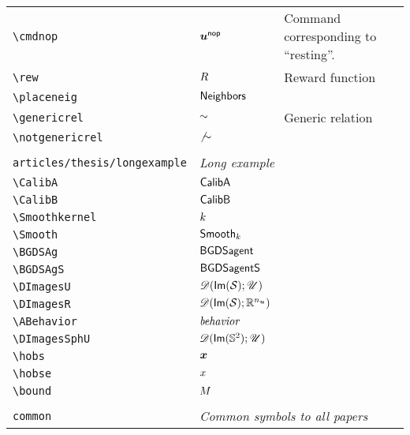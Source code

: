 \begin{longtable}{lll}
 {\color[rgb]{0.5,0.5,0.5}\texttt{\textbackslash cmdnop}} & $\boldsymbol{u}^{\mathsf{nop}}$ &  Command corresponding to ``resting''.\\ 
 {\color[rgb]{0.5,0.5,0.5}\texttt{\textbackslash rew}} & $R$ &  Reward function\\ 
 {\color[rgb]{0.5,0.5,0.5}\texttt{\textbackslash placeneig}} & $\mathsf{Neighbors}$ & \\ 
 {\color[rgb]{0.5,0.5,0.5}\texttt{\textbackslash genericrel}} & $\sim$ &  Generic relation\\ 
 {\color[rgb]{0.5,0.5,0.5}\texttt{\textbackslash notgenericrel}} & $\not{\sim}$ & \\ 
  &  & \\ 
 {\color[rgb]{0.5,0.5,0.5}\texttt{articles/thesis/longexample}} & \multicolumn{2}{l}{\emph{Long example}}\\ 
 \hline
{\color[rgb]{0.5,0.5,0.5}\texttt{\textbackslash CalibA}} & $\textsf{{CalibA}}$ & \\ 
 {\color[rgb]{0.5,0.5,0.5}\texttt{\textbackslash CalibB}} & $\textsf{{CalibB}}$ & \\ 
 {\color[rgb]{0.5,0.5,0.5}\texttt{\textbackslash Smoothkernel}} & $k$ & \\ 
 {\color[rgb]{0.5,0.5,0.5}\texttt{\textbackslash Smooth}} & $\textsf{{Smooth}}_{k}$ & \\ 
 {\color[rgb]{0.5,0.5,0.5}\texttt{\textbackslash BGDSAg}} & $\textsf{{BGDSagent}}$ & \\ 
 {\color[rgb]{0.5,0.5,0.5}\texttt{\textbackslash BGDSAgS}} & $\textsf{{BGDSagentS}}$ & \\ 
 {\color[rgb]{0.5,0.5,0.5}\texttt{\textbackslash DImagesU}} & $\DImagesU$ & \\ 
 {\color[rgb]{0.5,0.5,0.5}\texttt{\textbackslash DImagesR}} & $\DImagesR$ & \\ 
 {\color[rgb]{0.5,0.5,0.5}\texttt{\textbackslash ABehavior}} & $\textit{behavior}$ & \\ 
 {\color[rgb]{0.5,0.5,0.5}\texttt{\textbackslash DImagesSphU}} & $\mathscr{D}(\mathsf{Im}(\mathbb{S}^2);\mathscr{U})$ & \\ 
 {\color[rgb]{0.5,0.5,0.5}\texttt{\textbackslash hobs}} & $\boldsymbol{x}$ & \\ 
 {\color[rgb]{0.5,0.5,0.5}\texttt{\textbackslash hobse}} & $x$ & \\ 
 {\color[rgb]{0.5,0.5,0.5}\texttt{\textbackslash bound}} & $M$ & \\ 
  &  & \\ 
 {\color[rgb]{0.5,0.5,0.5}\texttt{common}} & \multicolumn{2}{l}{\emph{Common symbols to all papers}}\\ 

\end{longtable}
